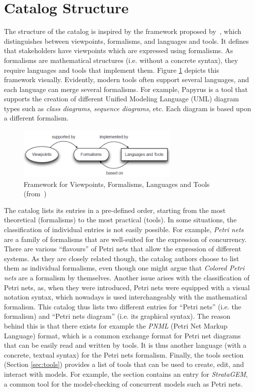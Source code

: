 \documentclass[final]{include/MPM4CPS/MPM4CPS-Report} %
\begin{document}
\section{Catalog Structure}\label{sec:CatalogStructure}
The structure of the catalog is inspired by the framework proposed by~\cite{Broman2012}, which distinguishes between viewpoints, formalisms, and languages and tools.
It defines that stakeholders have viewpoints which are expressed using formalisms.
As formalisms are mathematical structures (i.e. without a concrete syntax), they require languages and tools that implement them.
Figure \ref{fig:broman} depicts this framework visually. 
Evidently, modern tools often support several languages, and each language can merge several formalisms.
For example, Papyrus is a tool that supports the creation of different Unified Modeling Language (UML) diagram types such as \textit{class diagrams}, \textit{sequence diagrams}, etc.
Each diagram is based upon a different formalism.

\begin{figure}[!htb]
\centering
\includegraphics[width=0.7\textwidth]{figures/fw_viewpoints_bronan.png}
\caption{Framework for Viewpoints, Formalisms, Languages and Tools (from~\cite{Broman2012})}
\label{fig:broman}
\end{figure}

The catalog lists its entries in a pre-defined order, starting from the most theoretical (formalisms) to the most practical (tools).
In some situations, the classification of individual entries is not easily possible.
For example, \textit{Petri nets} are a family of formalisms that are well-suited for the expression of concurrency. 
There are various ``flavours'' of Petri nets that allow the expression of different systems.
As they are closely related though, the catalog authors choose to list them as individual formalisms, even though one might argue that \textit{Colored Petri nets} are a formalism by themselves.
Another issue arises with the classification of Petri nets, as, when they were introduced, Petri nets were equipped with a visual notation syntax, which nowadays is used interchangeably with the mathematical formalism.
This catalog thus lists two different entries for ``Petri nets'' (i.e. the formalism) and ``Petri nets diagram'' (i.e. its graphical syntax). 
The reason behind this is that there exists for example the \textit{PNML} (Petri Net Markup Language) format, which is a common exchange format for Petri net diagrams that can be easily read and written by tools.
It is thus another language (with a concrete, textual syntax) for the Petri nets formalism.
Finally, the tools section (Section \ref{sec:tools}) provides a list of tools that can be used to create, edit, and interact with models. 
For example, the section contains an entry for \textit{StrataGEM}, a common tool for the model-checking of concurrent models such as Petri nets.
\end{document}
